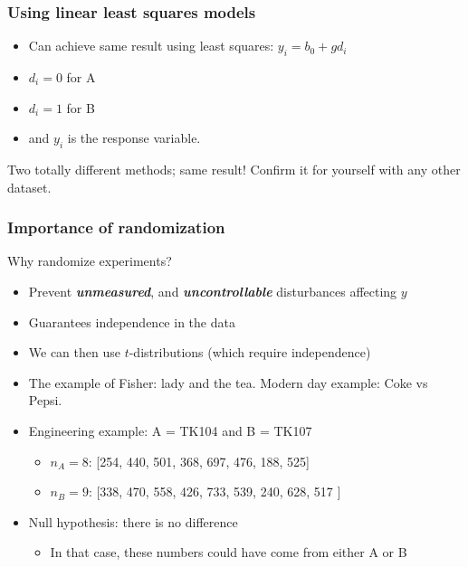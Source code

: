 \begin{frame}\frametitle{Using linear least squares models}
	\begin{itemize}
		\item	Can achieve same result using least squares: $y_i = b_0 + g d_i$
		\item	$d_i = 0$ for A
		\item	$d_i=1$ for B
		\item	and $y_i$ is the response variable.
	\end{itemize}
	
	\vspace{12pt}
	{\color{myOrange}{See question in this week's assignment.}}
	
	\vspace{12pt}
	Two totally different methods; same result! Confirm it for yourself with any other dataset.
\end{frame}

\begin{frame}\frametitle{Importance of randomization}

	Why randomize experiments?
	\begin{itemize}
		\item	Prevent \textbf{\emph{unmeasured}}, and \textbf{\emph{uncontrollable}} disturbances affecting $y$
		\item	Guarantees independence in the data
		\item	We can then use $t$-distributions (which require independence)
	\end{itemize}
	\begin{itemize}
		\item	The example of Fisher: lady and the tea. Modern day example: Coke vs Pepsi.
		\item	Engineering example: A = TK104 and B = TK107
		\begin{itemize}
			\item	$n_A = 8$: [254, 440, 501, 368, 697, 476, 188, 525]
			\item	$n_B = 9$: [338, 470, 558, 426, 733, 539, 240, 628, 517 ]
		\end{itemize}
		\item	Null hypothesis: there is no difference
		\begin{itemize}
			\item	In that case, these numbers could have come from either A or B
		\end{itemize}
	\end{itemize}
\end{frame}

